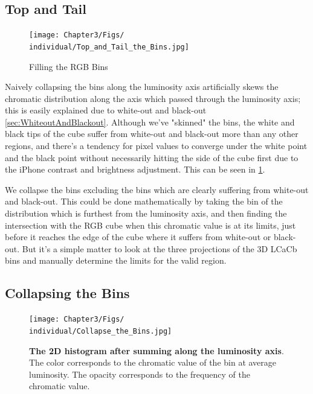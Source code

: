 \subsection{Top and Tail}\label{sec:TopAndTail}

\begin{figure}[h!]
  \centering
    \texttt{[image: Chapter3/Figs/\\individual/Top\_and\_Tail\_the\_Bins.jpg]}
        \caption{Filling the RGB Bins}  \label{fig:Top_and_Tail_the_Bins}
    \end{figure}


Naively collapsing the bins along the luminosity axis artificially skews the chromatic distribution along the axis which passed through the luminosity axis; this is easily explained due to white-out and black-out \ref{sec:WhiteoutAndBlackout}. 
Although we've "skinned" the bins, the white and black tips of the cube suffer from white-out and black-out more than any other regions, and there's a tendency for pixel values to converge under the white point and the black point without necessarily hitting the side of the cube first due to the iPhone contrast and brightness adjustment. This can be seen in  \ref{fig:Top_and_Tail_the_Bins}. 

We collapse the bins excluding the bins which are clearly suffering from white-out and black-out. This could be done mathematically by taking the bin of the distribution which is furthest from the luminosity axis, and then finding the intersection with the RGB cube when this chromatic value is at its limits, just before it reaches the edge of the cube where it suffers from white-out or black-out. But it's a simple matter to look at the three projections of the 3D LCaCb bins and manually determine the limits for the valid region.


\subsection{Collapsing the Bins}\label{sec:CollapsingTheBins}

\begin{figure}[h!]
  \centering
    \texttt{[image: Chapter3/Figs/\\individual/Collapse\_the\_Bins.jpg]}
        \caption{\textbf{The 2D histogram after summing along the luminosity axis}. The color corresponds to the chromatic value of the bin at average luminosity. The opacity corresponds to the frequency of the chromatic value. }  \label{fig:Collapse_the_Bins}
    \end{figure}
    

